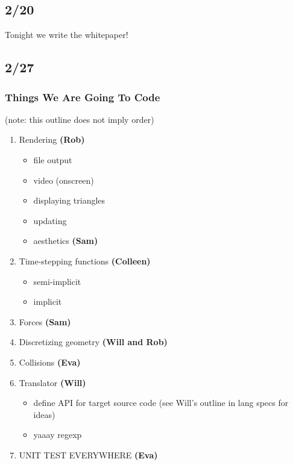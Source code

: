 \subsection*{2/20}

Tonight we write the whitepaper!

\subsection*{2/27}

\subsubsection*{Things We Are Going To Code}
(note: this outline does not imply order)
\begin{enumerate}
\item Rendering \textbf{(Rob)}
  \begin{itemize}
  \item file output
  \item video (onscreen)
  \item displaying triangles
  \item updating
  \item aesthetics \textbf{(Sam)}
  \end{itemize}

\item Time-stepping functions \textbf{(Colleen)}
  \begin{itemize}
  \item semi-implicit
  \item implicit
  \end{itemize}

\item Forces \textbf{(Sam)}

\item Discretizing geometry \textbf{(Will and Rob)}
\item Collisions \textbf{(Eva)}
\item Translator \textbf{(Will)}
  \begin{itemize}
  \item define API for target source code (see Will's outline in lang
    specs for ideas) 
  \item yaaay regexp
  \end{itemize}

\item UNIT TEST EVERYWHERE \textbf{(Eva)}
\end{enumerate}

